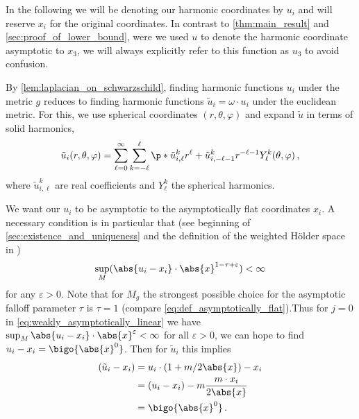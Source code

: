 \documentclass[titlepage,numbers=noenddot,oneside,%
cleardoublepage=empty,paper=a4,fontsize=11pt,%
english,%
]{scrartcl}
\newcommand*{\mathcomma}{\,,}
\newcommand*{\mathfullstop}{\,.}
\begin{document}
\begin{remark}
    In the following we will be denoting our harmonic coordinates by \( u_i \) and will reserve \( x_i \) for the original coordinates. In contrast to \cref{thm:main_result} and \cref{sec:proof_of_lower_bound}, were we used \( u \) to denote the harmonic coordinate asymptotic to \( x_3 \), we will always explicitly refer to this function as \( u_3 \) to avoid confusion.
\end{remark}
By \cref{lem:laplacian_on_schwarzschild}, finding harmonic functions \( u_i \) under the metric \( g \) reduces to finding harmonic functions \( \tilde{u}_i=\omega \cdot u_i \) under the euclidean metric. For this, we use spherical coordinates \( (r,\theta,\varphi) \) and expand \( \tilde{u} \) in terms of solid harmonics,
\begin{equation*}
    \tilde{u}_i(r,\theta,\varphi)=\sum_{\ell=0}^\infty \sum_{k=-\ell}^\ell \p*{\tilde{u}^k_{i,\ell} r^\ell + \tilde{u}^k_{i,-\ell-1} r^{-\ell-1}}Y^k_{\ell}(\theta,\varphi)\mathcomma
\end{equation*}
where \( \tilde{u}^k_{i,\ell} \) are real coefficients and \( Y^k_{\ell} \) the spherical harmonics.

We want our \( u_i \) to be asymptotic to the asymptotically flat coordinates \( x_i \). A necessary condition is in particular that (see beginning of \cref{sec:existence_and_uniqueness} and the definition of the weighted Hölder space in \cite[Section 3]{almarazPositiveMassTheorem2016})
\begin{equation}\label{eq:weakly_asymptotically_linear}
    \sup_M (\abs{u_i-x_i} \cdot\abs{x}^{1-\tau+\varepsilon})<\infty
\end{equation}
for any \( \varepsilon>0 \). Note that for \( M_g \) the strongest possible choice for the asymptotic falloff parameter \( \tau \) is \( \tau=1 \) (compare \cref{eq:def_asymptotically_flat}).Thus for \( j=0 \) in \cref{eq:weakly_asymptotically_linear} we have \( \sup_M \abs{u_i-x_i}\cdot \abs{x}^\varepsilon<\infty \) for all \( \varepsilon>0 \), \ie we can hope to find \( u_i-x_i=\bigo{\abs{x}^0} \). Then for \( \tilde{u}_i \) this implies
\begin{equation*}
    \begin{aligned}[t]
        (\tilde{u}_i-x_i)&=u_i\cdot (1+m/2\abs{x})-x_i\\
        &=(u_i-x_i)-m\frac{m\cdot x_i}{2\abs{x}}\\
        &=\bigo{\abs{x}^0}\mathfullstop
    \end{aligned}
\end{equation*}
\end{document}
